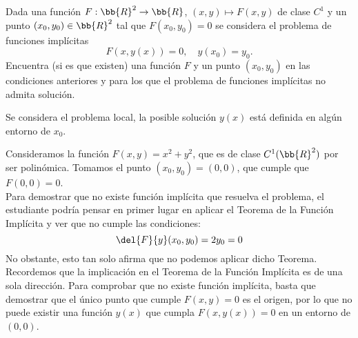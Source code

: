 \documentclass[12pt]{article}
\begin{document}
    \begin{ejercicio}
        Dada una función $F : \bb{R}^2 \to \bb{R}$, $(x, y) \mapsto F(x, y)$ de clase $C^1$ y un punto $(x_0, y_0) \in \bb{R}^2$ tal que $F(x_0, y_0) = 0$ se considera el problema de funciones implícitas
        \begin{equation*}
            F(x, y(x)) = 0, \quad y(x_0) = y_0.
        \end{equation*}
        Encuentra (si es que existen) una función $F$ y un punto $(x_0, y_0)$ en las condiciones anteriores y para los que el problema de funciones implícitas no admita solución.
        \begin{observacion}
            Se considera el problema local, la posible solución $y(x)$ está definida en algún entorno de $x_0$.
        \end{observacion}

        Consideramos la función $F(x, y) = x^2+y^2$, que es de clase $C^1(\bb{R}^2)$ por ser polinómica. Tomamos el punto $(x_0, y_0) = (0, 0)$, que cumple que $F(0, 0) = 0$.\\

        Para demostrar que no existe función implícita que resuelva el problema, el estudiante podría pensar en primer lugar en aplicar el Teorema de la Función Implícita y ver que no cumple las condiciones:
        \begin{equation*}
            \del{F}{y}(x_0, y_0) = 2y_0=0
        \end{equation*}
        No obstante, esto tan solo afirma que no podemos aplicar dicho Teorema. Recordemos que la implicación en el Teorema de la Función Implícita es de una sola dirección. Para comprobar que no existe función implícita, basta que demostrar que el único punto que cumple $F(x,y) = 0$ es el origen, por lo que no puede existir una función $y(x)$ que cumpla $F(x, y(x)) = 0$ en un entorno de $(0, 0)$.\\
    \end{ejercicio}
\end{document}
